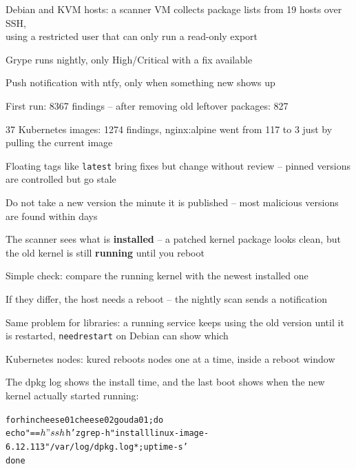 \documentclass[Screen16to9,17pt]{foils}
\begin{document}

\begin{list2}
\item Debian and KVM hosts: a scanner VM collects package lists from 19 hosts over SSH,\\
using a restricted user that can only run a read-only export
\item Grype runs nightly, only High/Critical with a fix available
\item Push notification with ntfy, only when something new shows up
\item First run: 8367 findings -- after removing old leftover packages: 827
\item 37 Kubernetes images: 1274 findings, nginx:alpine went from 117 to 3 just by pulling the current image
\item Floating tags like \verb+latest+ bring fixes but change without review -- pinned versions are controlled but go stale
\item Do not take a new version the minute it is published -- most malicious versions are found within days
\end{list2}


\begin{list2}
\item The scanner sees what is {\bf installed} -- a patched kernel package looks clean, but the old kernel is still {\bf running} until you reboot
\item Simple check: compare the running kernel with the newest installed one
\item If they differ, the host needs a reboot -- the nightly scan sends a notification
\item Same problem for libraries: a running service keeps using the old version until it is restarted, \verb+needrestart+ on Debian can show which
\item Kubernetes nodes: kured reboots nodes one at a time, inside a reboot window
\end{list2}

The dpkg log shows the install time, and the last boot shows when the new kernel actually started running:
\begin{alltt}\footnotesize
for h in cheese01 cheese02 gouda01; do
  echo "== $h"
  ssh $h 'zgrep -h " install linux-image-6.12.113" /var/log/dpkg.log*; uptime -s'
done
\end{alltt}
\end{document}
